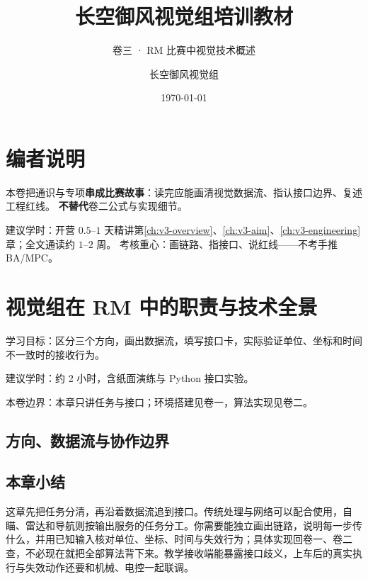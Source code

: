\documentclass[
  lang=cn,
  scheme=chinese,
  chinesefont=ctexfont,
  11pt,
  oneside,
  device=normal,
  color=cyan,
  mode=fancy
]{elegantbook}
\title{长空御风视觉组培训教材}
\subtitle{卷三 · RM 比赛中视觉技术概述}
\author{长空御风视觉组}
\institute{视觉组培训}
\date{\today}
\begin{document}
\maketitle

\frontmatter

\chapter*{编者说明}
本卷把通识与专项\textbf{串成比赛故事}：读完应能画清视觉数据流、指认接口边界、复述工程红线。
\textbf{不替代}卷二公式与实现细节。

\noindent 建议学时：开营 $0.5$--$1$ 天精讲第\ref{ch:v3-overview}、\ref{ch:v3-aim}、\ref{ch:v3-engineering}章；全文通读约 $1$--$2$ 周。
考核重心：画链路、指接口、说红线——不考手推 BA/MPC。

\tableofcontents

\mainmatter

\chapter{视觉组在 RM 中的职责与技术全景}
\begin{introduction}
  \item 学习目标：区分三个方向，画出数据流，填写接口卡，实际验证单位、坐标和时间不一致时的接收行为。
  \item 建议学时：约 2 小时，含纸面演练与 Python 接口实验。
  \item 本卷边界：本章只讲任务与接口；环境搭建见卷一，算法实现见卷二。
\end{introduction}
\label{ch:v3-overview}

\section{方向、数据流与协作边界}


\section{本章小结}
\begin{conclusion}
这章先把任务分清，再沿着数据流追到接口。传统处理与网络可以配合使用，自瞄、雷达和导航则按输出服务的任务分工。你需要能独立画出链路，说明每一步传什么，并用已知输入核对单位、坐标、时间与失效行为；具体实现回卷一、卷二查，不必现在就把全部算法背下来。教学接收端能暴露接口歧义，上车后的真实执行与失效动作还要和机械、电控一起联调。
\end{conclusion}
\end{document}
